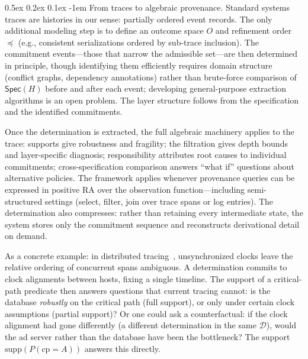 \documentclass[acmsmall,review,anonymous]{acmart}
\makeatletter
\renewcommand{\paragraph}{\@startsection{paragraph}{4}{\z@}%
  {0.5ex \@plus 0.2ex \@minus 0.1ex}%
  {-1em}%
  {\normalfont\normalsize\bfseries}}
\newcommand{\Spec}{\mathsf{Spec}}
\newcommand{\Ord}{\preceq}
\theoremstyle{remark}
\numberwithin{definition}{section}
\numberwithin{theorem}{section}
\numberwithin{lemma}{section}
\numberwithin{corollary}{section}
\numberwithin{remark}{section}
\numberwithin{example}{section}
\numberwithin{observation}{section}
\numberwithin{assumption}{section}
\makeatother
\begin{document}
\paragraph{From traces to algebraic provenance.}
Standard systems traces are histories in our sense: partially ordered
event records.
The only additional modeling step is to define an outcome space $O$ and
refinement order $\Ord$ (e.g., consistent serializations ordered by
sub-trace inclusion).
The commitment events---those that narrow the admissible set---are then
determined in principle, though identifying them efficiently requires
domain structure (conflict graphs, dependency annotations) rather than
brute-force comparison of $\Spec(H)$ before and after each event;
developing general-purpose extraction algorithms is an open problem.
The layer structure follows from the specification and the identified
commitments.

Once the determination is extracted, the full algebraic machinery
applies to the trace: supports give robustness and fragility;
the filtration gives depth bounds and layer-specific diagnosis;
responsibility attributes root causes to individual commitments;
cross-specification comparison answers ``what if'' questions about
alternative policies.
The framework applies whenever provenance queries can be expressed in
positive RA over the observation function---including semi-structured
settings (select, filter, join over trace spans or log entries).
The determination also compresses: rather than retaining every
intermediate state, the system stores only the commitment sequence and
reconstructs derivational detail on demand.

As a concrete example: in distributed
tracing~\cite{sigelman2010dapper}, unsynchronized clocks leave the
relative ordering of concurrent spans ambiguous.
A determination commits to clock alignments between hosts, fixing a
single timeline.
The support of a critical-path predicate then answers questions that
current tracing cannot: is the database \emph{robustly} on the
critical path (full support), or only under certain clock assumptions
(partial support)?
Or one could ask a counterfactual: if the clock alignment had gone
differently (a different determination in the same $\mathcal{D}$),
would the ad server rather than the database have been the
bottleneck?
The support $\mathrm{supp}(P(\mathrm{cp}=A))$ answers this directly.
\end{document}
